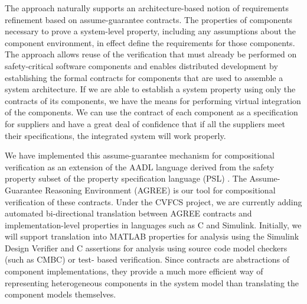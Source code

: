 The approach naturally supports an architecture-based notion of requirements refinement based on assume-guarantee contracts. The properties of components necessary to prove a system-level property, including any assumptions about the component environment, in effect define the requirements for those components. The approach allows reuse of the verification that must already be performed on safety-critical software components and enables distributed development by establishing the formal contracts for components that are used to assemble a system architecture. If we are able to establish a system property using only the contracts of its components, we have the means for performing virtual integration of the components. We can use the contract of each component as a specification for suppliers and have a great deal of confidence that if all the suppliers meet their specifications, the integrated system will work properly.

We have implemented this assume-guarantee mechanism for compositional verification as an extension of the AADL language derived from the safety property subset of the property specification language (PSL) \cite{IEEE:PSL}. The Assume-Guarantee Reasoning Environment (AGREE) is our tool for compositional verification of these contracts. Under the CVFCS project, we are currently adding automated bi-directional translation between AGREE contracts and implementation-level properties in languages such as C and Simulink. Initially, we will support translation into MATLAB properties for analysis using the Simulink Design Verifier and C assertions for analysis using source code model checkers (such as CMBC) or test- based verification. Since contracts are abstractions of component implementations, they provide a much more efficient way of representing heterogeneous components in the system model than translating the component models themselves.



